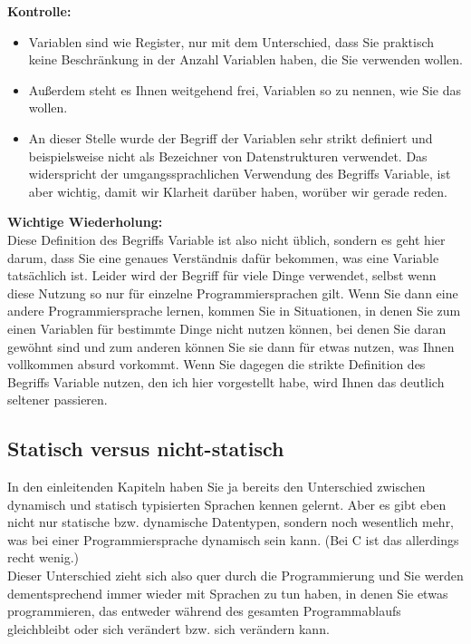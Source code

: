 \textbf{Kontrolle:}\\

\begin{itemize}
	\item Variablen sind wie Register, nur mit dem Unterschied, dass Sie praktisch keine Beschränkung in der Anzahl Variablen haben, die Sie verwenden wollen. 
	\item Außerdem steht es Ihnen weitgehend frei, Variablen so zu nennen, wie Sie das wollen. 
	\item An dieser Stelle wurde der Begriff der Variablen sehr strikt definiert und beispielsweise nicht als Bezeichner von Datenstrukturen verwendet. Das widerspricht der umgangssprachlichen Verwendung des Begriffs Variable, ist aber wichtig, damit wir Klarheit darüber haben, worüber wir gerade reden.
\end{itemize}

\textbf{Wichtige Wiederholung:}\\

Diese Definition des Begriffs Variable ist also nicht üblich, sondern es geht hier darum, dass Sie eine genaues Verständnis dafür bekommen, was eine Variable tatsächlich ist. Leider wird der Begriff für viele Dinge verwendet, selbst wenn diese Nutzung so nur für einzelne Programmiersprachen gilt. Wenn Sie dann eine andere Programmiersprache lernen, kommen Sie in Situationen, in denen Sie zum einen Variablen für bestimmte Dinge nicht nutzen können, bei denen Sie daran gewöhnt sind und zum anderen können Sie sie dann für etwas nutzen, was Ihnen vollkommen absurd vorkommt. Wenn Sie dagegen die strikte Definition des Begriffs Variable nutzen, den ich hier vorgestellt habe, wird Ihnen das deutlich seltener passieren.

\subsection{Statisch versus nicht-statisch}

In den einleitenden Kapiteln haben Sie ja bereits den Unterschied zwischen dynamisch und statisch typisierten Sprachen kennen gelernt. Aber es gibt eben nicht nur statische bzw. dynamische Datentypen, sondern noch wesentlich mehr, was bei einer Programmiersprache dynamisch sein kann. (Bei C ist das allerdings recht wenig.)\\

Dieser Unterschied zieht sich also quer durch die Programmierung und Sie werden dementsprechend immer wieder mit Sprachen zu tun haben, in denen Sie etwas programmieren, das entweder während des gesamten Programmablaufs gleichbleibt oder sich verändert bzw. sich verändern kann.\\

